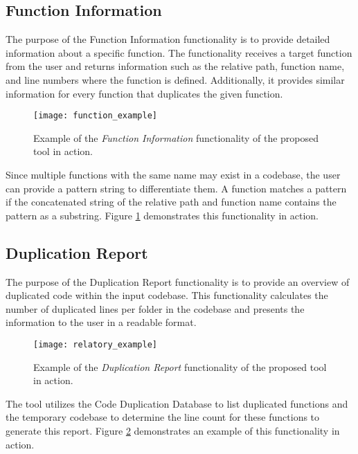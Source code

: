 \subsection{Function Information}
\label{subsec:functioncommand}

The purpose of the Function Information functionality is to provide detailed information about a specific function. The functionality receives a target function from the user and returns information such as the relative path, function name, and line numbers where the function is defined. Additionally, it provides similar information for every function that duplicates the given function.

\begin{figure}
\texttt{[image: function\_example]}
\caption{Example of the \textit{Function Information} functionality of the proposed tool in action.}
\label{fig:function_ex}
\end{figure}

Since multiple functions with the same name may exist in a codebase, the user can provide a pattern string to differentiate them. A function matches a pattern if the concatenated string of the relative path and function name contains the pattern as a substring. Figure \ref{fig:function_ex} demonstrates this functionality in action.

\subsection{Duplication Report}

The purpose of the Duplication Report functionality is to provide an overview of duplicated code within the input codebase. This functionality calculates the number of duplicated lines per folder in the codebase and presents the information to the user in a readable format. 

\begin{figure}
\texttt{[image: relatory\_example]}
\caption{Example of the \textit{Duplication Report} functionality of the proposed tool in action.}
\label{fig:relatory_ex}
\end{figure}

The tool utilizes the Code Duplication Database to list duplicated functions and the temporary codebase to determine the line count for these functions to generate this report. Figure \ref{fig:relatory_ex} demonstrates an example of this functionality in action.



